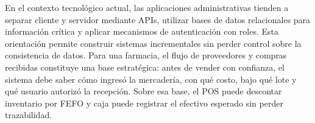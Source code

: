 En el contexto tecnológico actual, las aplicaciones administrativas tienden a separar cliente y servidor mediante APIs, utilizar bases de datos relacionales para información crítica y aplicar mecanismos de autenticación con roles. Esta orientación permite construir sistemas incrementales sin perder control sobre la consistencia de datos. Para una farmacia, el flujo de proveedores y compras recibidas constituye una base estratégica: antes de vender con confianza, el sistema debe saber cómo ingresó la mercadería, con qué costo, bajo qué lote y qué usuario autorizó la recepción. Sobre esa base, el POS puede descontar inventario por FEFO y caja puede registrar el efectivo esperado sin perder trazabilidad.
